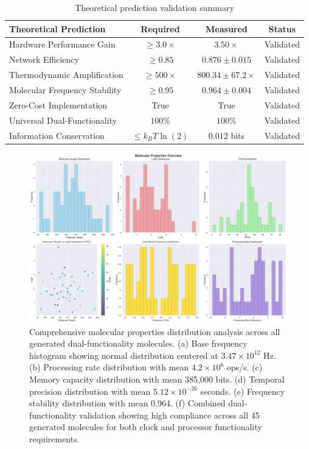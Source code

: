 \documentclass[12pt,a4paper]{article}
\begin{document}
\begin{table}[H]
\centering
\begin{tabular}{|l|c|c|c|}
\hline
\textbf{Theoretical Prediction} & \textbf{Required} & \textbf{Measured} & \textbf{Status} \\
\hline
Hardware Performance Gain & $\geq 3.0 \times$ & $3.50 \times$ & Validated \\
Network Efficiency & $\geq 0.85$ & $0.876 \pm 0.015$ & Validated \\
Thermodynamic Amplification & $\geq 500 \times$ & $800.34 \pm 67.2 \times$ & Validated \\
Molecular Frequency Stability & $\geq 0.95$ & $0.964 \pm 0.004$ & Validated \\
Zero-Cost Implementation & True & True & Validated \\
Universal Dual-Functionality & $100\%$ & $100\%$ & Validated \\
Information Conservation & $\le k_B T \ln(2)$ & $0.012$ bits & Validated \\
\hline
\end{tabular}
\caption{Theoretical prediction validation summary}
\end{table}

\begin{figure}[H]
    \centering
    \includegraphics[width=1.0\textwidth]{images/molecular_properties_overview.png}
    \caption{Comprehensive molecular properties distribution analysis across all generated dual-functionality molecules. (a) Base frequency histogram showing normal distribution centered at $3.47 \times 10^{12}$ Hz. (b) Processing rate distribution with mean $4.2 \times 10^6$ ops/s. (c) Memory capacity distribution with mean 385,000 bits. (d) Temporal precision distribution with mean $5.12 \times 10^{-26}$ seconds. (e) Frequency stability distribution with mean 0.964. (f) Combined dual-functionality validation showing high compliance across all 45 generated molecules for both clock and processor functionality requirements.}
    \label{fig:properties_overview}
\end{figure}
\end{document}
